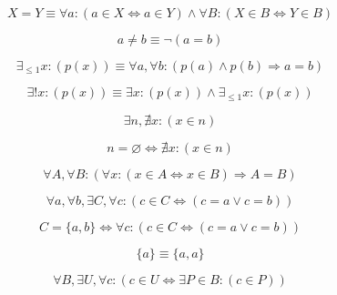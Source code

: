 \documentclass{main}
\begin{document}
\begin{notation}[Equality]
$$
	X=Y
	\equiv
	\forall a:(
		a\in X
		\Leftrightarrow
		a\in Y
	)
	\land
	\forall B:(
		X\in B
		\Leftrightarrow
		Y\in B
	)
$$
\end{notation}

\begin{notation}
$$
	a\neq b
	\equiv
	\neg(a=b)
$$
\end{notation}

\begin{notation}
$$
	\exists_{\leq 1}x:(
		p(x)
	)
	\equiv
	\forall a,
	\forall b:(
		p(a)\land p(b)\Rightarrow a = b
	)
$$
\end{notation}

\begin{notation}
$$
	\exists!x:(
		p(x)
	)
	\equiv
	\exists x:(
		p(x)
	)
	\land
	\exists_{\leq 1}x:(
		p(x)
	)
$$
\end{notation}

\begin{axiom}
$$
	\exists n,
	\nexists x:(
		x\in n
	)
$$
\end{axiom}

\begin{definition}
$$
	n=\varnothing
	\Leftrightarrow
	\nexists x:(
		x\in n
	)
$$
\end{definition}

\begin{axiom}[Extensionality]
$$
	\forall A,
	\forall B:(
		\forall x:(
			x\in A
			\Leftrightarrow
			x\in B
		)
		\Rightarrow
		A=B
	)
$$
\end{axiom}

\begin{axiom}[Pairing]
$$
	\forall a,
	\forall b,
	\exists C,
	\forall c:(
		c\in C
		\Leftrightarrow
		(
			c=a
			\lor
			c=b
		)
	)
$$
\end{axiom}

\begin{definition}[Couple]
$$
	C=\{a,b\}
	\Leftrightarrow
	\forall c:(
		c\in C
		\Leftrightarrow
		(
			c=a
			\lor
			c=b
		)
	)
$$
\end{definition}

\begin{notation}[Singleton]
$$
	\{a\}
	\equiv
	\{a,a\}
$$
\end{notation}

\begin{axiom}[Union]
$$
	\forall B,
	\exists U,
	\forall c:(
		c\in U
		\Leftrightarrow
		\exists P\in B:(
			c\in P
		)
	)
$$
\end{axiom}
\end{document}
